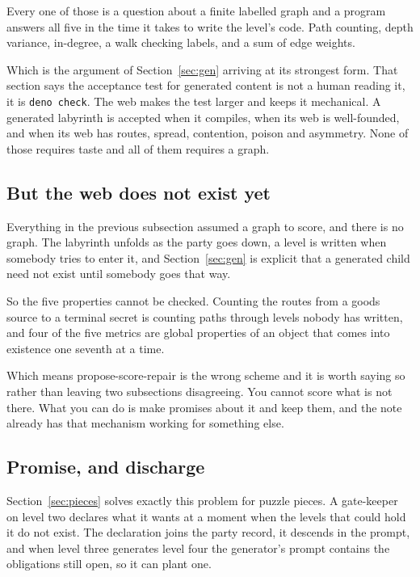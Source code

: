 \documentclass[11pt,a4paper]{article}
\begin{document}
Every one of those is a question about a finite labelled graph and a program answers all five in
the time it takes to write the level's code. Path counting, depth variance, in-degree, a walk
checking labels, and a sum of edge weights.

\begin{sectionbox}
Which is the argument of Section~\ref{sec:gen} arriving at its strongest form. That section says
the acceptance test for generated content is not a human reading it, it is \texttt{deno check}. The
web makes the test larger and keeps it mechanical. A generated labyrinth is accepted when it
compiles, when its web is well-founded, and when its web has routes, spread, contention, poison and
asymmetry. None of those requires taste and all of them requires a graph.
\end{sectionbox}

\subsection{But the web does not exist yet}
\label{sec:promise}

Everything in the previous subsection assumed a graph to score, and there is no graph. The
labyrinth unfolds as the party goes down, a level is written when somebody tries to enter it, and
Section~\ref{sec:gen} is explicit that a generated child need not exist until somebody goes that
way.

So the five properties cannot be checked. Counting the routes from a goods source to a terminal
secret is counting paths through levels nobody has written, and four of the five metrics are global
properties of an object that comes into existence one seventh at a time.

\begin{alarmbox}
Which means propose-score-repair is the wrong scheme and it is worth saying so rather than leaving
two subsections disagreeing. You cannot score what is not there. What you can do is make promises
about it and keep them, and the note already has that mechanism working for something else.
\end{alarmbox}

\subsection{Promise, and discharge}

Section~\ref{sec:pieces} solves exactly this problem for puzzle pieces. A gate-keeper on level two
declares what it wants at a moment when the levels that could hold it do not exist. The declaration
joins the party record, it descends in the prompt, and when level three generates level four the
generator's prompt contains the obligations still open, so it can plant one.
\end{document}
